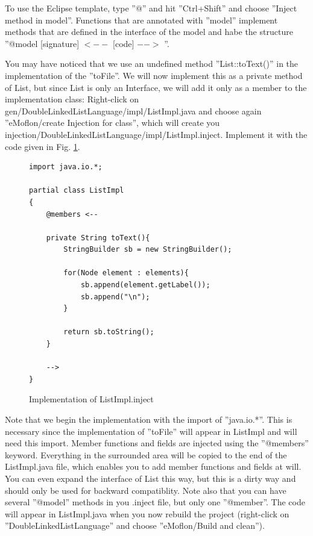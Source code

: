 To use the Eclipse template, type ''$@$'' and hit ''Ctrl+Shift'' and choose ''Inject method in model''. Functions that are annotated with ''\@ model'' implement methods that are defined in the interface of the model and habe the structure ''@model [signature] $<--$ [code] $-->$ ''.

You may have noticed that we use an undefined method ''List::toText()'' in the implementation of the ''toFile''. We will now implement this as a private method of List, but since List is only an Interface, we will add it only as a member to the implementation class: Right-click on gen/DoubleLinkedListLanguage/impl/ListImpl.java and choose again ''eMoflon/create Injection for class'', which will create you injection/DoubleLinkedListLanguage/impl/ListImpl.inject. Implement it with the code given in Fig. \ref{code:listImpl_toText_impl}.


\begin{figure}[htbp]
        \centering
        \begin{lstlisting}
import java.io.*;

partial class ListImpl
{
    @members <--

    private String toText(){
        StringBuilder sb = new StringBuilder();

        for(Node element : elements){
            sb.append(element.getLabel());
            sb.append("\n");
        }

        return sb.toString();
    }

    -->
}
        \end{lstlisting}
        \caption{Implementation of ListImpl.inject}
        \label{code:listImpl_toText_impl}
    \end{figure}

Note that we begin the implementation with the import of ''java.io.*''. This is necessary since the implementation of ''toFile'' will appear in ListImpl and will need this import. Member functions and fields are injected using the ''@members'' keyword. Everything in the surrounded area will be copied to the end of the ListImpl.java file, which enables you to add member functions and fields at will. You can even expand the interface of List this way, but this is a dirty way and should only be used for backward compatiblity. Note also that you can have several ''@model'' methods in you .inject file, but only one ''@member''.
The code will appear in ListImpl.java when you now rebuild the project (right-click on ''DoubleLinkedListLanguage'' and choose ''eMoflon/Build and clean'').